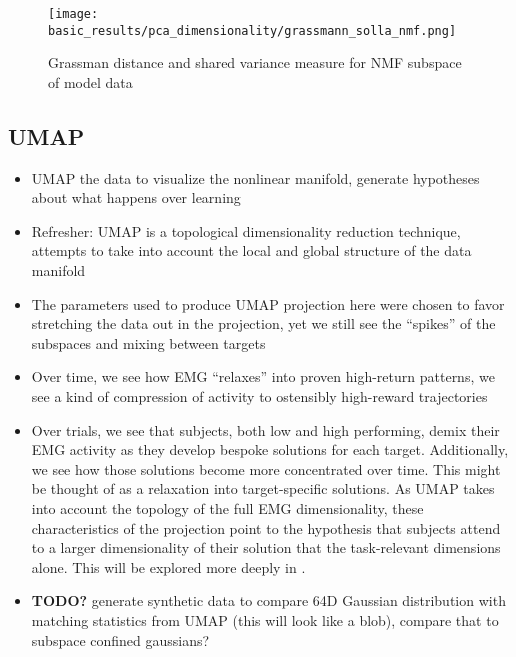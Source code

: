 \documentclass[../main.tex]{subfiles}
\begin{document}
\begin{figure}[H]%
  \centering
  \texttt{[image: basic\_results/pca\_dimensionality/grassmann\_solla\_nmf.png]}
  \caption[Comparison of NMF subspaces over models]{Grassman distance and shared variance measure for NMF subspace of model data}\label{fig:grassman_solla_pca}
\end{figure}







\subsection{UMAP}

\begin{itemize}
  \setlength\itemsep{0em}
  \item UMAP the data to visualize the nonlinear manifold, generate hypotheses about what happens over learning
  \item Refresher: UMAP is a topological dimensionality reduction technique, attempts to take into account the local and global structure of the data manifold 
  \item The parameters used to produce UMAP projection here were chosen to favor stretching the data out in the projection, yet we still see the ``spikes'' of the subspaces and mixing between targets
  \item Over time, we see how EMG ``relaxes'' into proven high-return patterns, we see a kind of compression of activity to ostensibly high-reward trajectories
  \item Over trials, we see that subjects, both low and high performing, demix their EMG activity as they develop bespoke solutions for each target. Additionally, we see how those solutions become more concentrated over time. This might be thought of as a relaxation into target-specific solutions. As UMAP takes into account the topology of the full EMG dimensionality, these characteristics of the projection point to the hypothesis that subjects attend to a larger dimensionality of their solution that the task-relevant dimensions alone. This will be explored more deeply in .
  \item \textbf{TODO?} generate synthetic data to compare 64D Gaussian distribution with matching statistics from UMAP (this will look like a blob), compare that to subspace confined gaussians?
\end{itemize}
\end{document}
